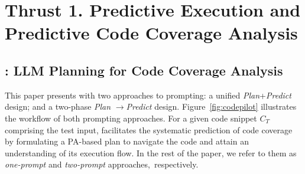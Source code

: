 \section{Thrust 1. Predictive Execution and Predictive Code Coverage Analysis}
\label{sec:thrust1}

\subsection{{\cctool}: LLM Planning for Code Coverage Analysis}
\label{sec:approach_overview}





%
This paper presents {\cctool} with two approaches to prompting: a
unified \textit{Plan}+\textit{Predict} design; and a two-phase
\textit{Plan} $\xrightarrow{}$\textit{Predict} design.
Figure~\ref{fig:codepilot} illustrates the workflow of both prompting
approaches.
For a given code snippet $C_T$ comprising the test input, {\cctool}
facilitates the systematic prediction of code coverage by formulating
a PA-based plan to navigate the code and attain an
understanding of its execution flow.  In the rest of the paper,
we refer to them as {\em one-prompt} and {\em two-prompt}
approaches,~respectively.


